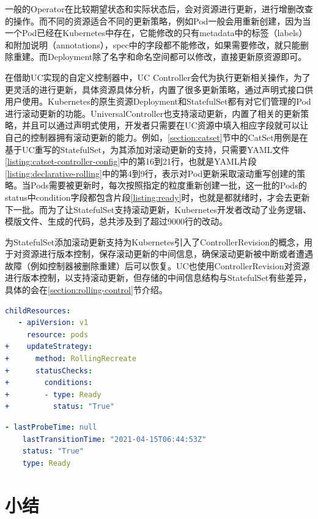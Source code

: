 \documentclass[macfonts,master]{njuthesis}
\begin{document}
一般的Operator在比较期望状态和实际状态后，会对资源进行更新，进行增删改查的操作。而不同的资源适合不同的更新策略，例如Pod一般会用重新创建，因为当一个Pod已经在Kubernetes中存在，它能修改的只有metadata中的标签（labels）和附加说明（annotations），spec中的字段都不能修改，如果需要修改，就只能删除重建。而Deployment除了名字和命名空间都可以修改，直接更新原资源即可。

在借助UC实现的自定义控制器中，UC Controller会代为执行更新相关操作，为了更灵活的进行更新，具体资源具体分析，内置了很多更新策略，通过声明式接口供用户使用。Kubernetes的原生资源Deployment和StatefulSet都有对它们管理的Pod进行滚动更新的功能。UniversalController也支持滚动更新，内置了相关的更新策略，并且可以通过声明式使用，开发者只需要在UC资源中填入相应字段就可以让自己的控制器拥有滚动更新的能力。例如，\ref{section:catset}节中的CatSet用例是在基于UC重写的StatefulSet，为其添加对滚动更新的支持，只需要YAML文件\ref{listing:catset-controller-config}中的第16到21行，也就是YAML片段\ref{listing:declarative-rolling}中的第4到9行，表示对Pod更新采取滚动重写创建的策略。当Pods需要被更新时，每次按照指定的粒度重新创建一批，这一批的Pods的status中condition字段都包含片段\ref{listing:ready}时，也就是都就绪时，才会去更新下一批。而为了让StatefulSet支持滚动更新，Kubernetes开发者改动了业务逻辑、模版文件、生成的代码，总共涉及到了超过9000行的改动\cite{statefulsetupdate}。

为StatefulSet添加滚动更新支持为Kubernetes引入了ControllerRevision的概念，用于对资源进行版本控制，保存滚动更新的中间信息，确保滚动更新被中断或者遭遇故障（例如控制器被删除重建）后可以恢复。UC也使用ControllerRevision对资源进行版本控制，以支持滚动更新，但存储的中间信息结构与StatefulSet有些差异，具体的会在\ref{section:rolling-control}节介绍。
\begin{lstlisting}[language=yaml,caption=添加滚动更新,label=listing:declarative-rolling]
   childResources:
   - apiVersion: v1
     resource: pods
+    updateStrategy:
+      method: RollingRecreate
+      statusChecks:
+        conditions:
+        - type: Ready
+          status: "True"
\end{lstlisting}

\begin{lstlisting}[language=YAML,caption=状态Ready为True,label=listing:ready]
  - lastProbeTime: null
    lastTransitionTime: "2021-04-15T06:44:53Z"
    status: "True"
    type: Ready
\end{lstlisting}

\section{小结}
\end{document}

